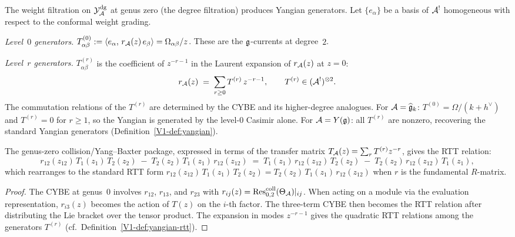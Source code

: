 \begin{construction}
The weight filtration on $\mathcal{Y}^{\mathrm{dg}}_{\mathcal{A}}$ at genus zero
(the degree filtration) produces Yangian generators.
Let $\{e_\alpha\}$ be a basis of $\mathcal{A}^!$ homogeneous with respect
to the conformal weight grading.

\emph{Level~$0$ generators.}
$T_{\alpha\beta}^{(0)} := \langle e_\alpha,\,r_{\mathcal{A}}(z)\,e_\beta\rangle
= \Omega_{\alpha\beta}/z$.
These are the $\mathfrak{g}$-currents at degree~$2$.

\emph{Level~$r$ generators.}
$T_{\alpha\beta}^{(r)}$ is the coefficient of $z^{-r-1}$ in the
Laurent expansion of $r_{\mathcal{A}}(z)$ at $z = 0$:
\begin{equation}%
r_\cA(z)
\;=\;
\sum_{r \geq 0}
T^{(r)}\,z^{-r-1},
\qquad
T^{(r)} \in (\cA^!)^{\otimes 2}.
\end{equation}
The commutation relations of the $T^{(r)}$ are determined by the
CYBE and its higher-degree analogues. For $\mathcal{A} = \widehat{\mathfrak{g}}_k$:
$T^{(0)} = \Omega/(k+h^\vee)$ and $T^{(r)} = 0$ for $r \geq 1$,
so the Yangian is generated by the level-$0$ Casimir alone.
For $\mathcal{A} = Y(\mathfrak{g})$: all $T^{(r)}$ are nonzero, recovering the
standard Yangian generators
(Definition~\ref{V1-def:yangian}).
\end{construction}

\begin{proposition}
\label{prop:thqg-V-rtt-from-sgybe}
The genus-zero collision/Yang--Baxter package, expressed in terms
of the transfer matrix
$T_{\mathcal{A}}(z) = \sum_r T^{(r)} z^{-r}$, gives the RTT relation:
\begin{equation}%
r_{12}(z_{12})\,T_1(z_1)\,T_2(z_2)
\;-\;
T_2(z_2)\,T_1(z_1)\,r_{12}(z_{12})
\;=\;
T_1(z_1)\,r_{12}(z_{12})\,T_2(z_2)
\;-\;
T_2(z_2)\,r_{12}(z_{12})\,T_1(z_1),
\end{equation}
which rearranges to the standard RTT form
$r_{12}(z_{12})\,T_1(z_1)\,T_2(z_2)
= T_2(z_2)\,T_1(z_1)\,r_{12}(z_{12})$
when $r$ is the fundamental $R$-matrix.
\end{proposition}

\begin{proof}
The CYBE at genus~$0$ involves $r_{12}$, $r_{13}$, and $r_{23}$ with
$r_{ij}(z) = \operatorname{Res}^{\mathrm{coll}}_{0,2}(\Theta_{\mathcal{A}})|_{ij}$. When acting on a
module via the evaluation representation, $r_{i3}(z)$ becomes the
action of $T(z)$ on the $i$-th factor. The three-term CYBE then
becomes the RTT relation after distributing the Lie bracket over the
tensor product. The expansion in modes $z^{-r-1}$ gives the
quadratic RTT relations among the generators $T^{(r)}$
(cf.~Definition~\ref{V1-def:yangian-rtt}).
\end{proof}


